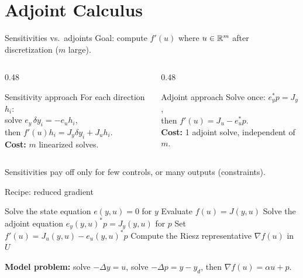 \documentclass[main.tex]{subfiles}
\begin{document}
\section{Adjoint Calculus}

\begin{frame}{Sensitivities vs.\ adjoints}
  Goal: compute $f'(u)$ where $u \in \mathbb{R}^m$ after discretization ($m$ large).
  \begin{columns}[T]
    \begin{column}{0.48\textwidth}
      \begin{block}{Sensitivity approach}
        For each direction $h_i$:\\
        solve $e_y\,\delta y_i = -e_u h_i$,\\
        then $f'(u)h_i = J_y\delta y_i + J_u h_i$.\\[0.5ex]
        \textbf{Cost:} $m$ linearized solves.
      \end{block}
    \end{column}
    \begin{column}{0.48\textwidth}
      \begin{block}{Adjoint approach}
        Solve once: $e_y^* p = J_y$,\\
        then $f'(u) = J_u - e_u^* p$.\\[2.6ex]
        \textbf{Cost:} 1 adjoint solve, independent of $m$.
      \end{block}
    \end{column}
  \end{columns}
  \vspace{1ex}
  Sensitivities pay off only for few controls, or many outputs (constraints).
\end{frame}

\begin{frame}{Recipe: reduced gradient}
  \begin{algorithm}[H]
    \caption{Evaluate $f(u)$ and $\nabla f(u)$}
    Solve the state equation $e(y,u) = 0$ for $y$\;
    Evaluate $f(u) = J(y,u)$\;
    Solve the adjoint equation $e_y(y,u)^* p = J_y(y,u)$ for $p$\;
    Set $f'(u) = J_u(y,u) - e_u(y,u)^* p$\;
    Compute the Riesz representative $\nabla f(u)$ in $U$ 
  \end{algorithm}
  \vspace{1ex}
  \textbf{Model problem:} solve $-\Delta y = u$, solve $-\Delta p = y - y_d$, then $\nabla f(u) = \alpha u + p$.
\end{frame}
\end{document}
